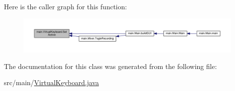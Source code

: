 Here is the caller graph for this function\+:
\nopagebreak
\begin{figure}[H]
\begin{center}
\leavevmode
\includegraphics[width=350pt]{classmain_1_1_virtual_keyboard_a3769ae902b9d0070b869af65983ac3dd_icgraph}
\end{center}
\end{figure}




The documentation for this class was generated from the following file\+:\begin{DoxyCompactItemize}
\item 
src/main/\hyperlink{_virtual_keyboard_8java}{Virtual\+Keyboard.\+java}\end{DoxyCompactItemize}
